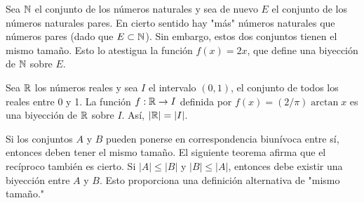 \documentclass[12pt,a4paper]{book}
\newcommand{\comillas}[1]{"#1"}
\begin{document}
    \begin{ejemplo}
        Sea $\mathbb{N}$ el conjunto de los números naturales y sea de nuevo $E$ el conjunto de los números naturales pares. En
        cierto sentido hay \comillas{más} números naturales que números pares (dado que $E\subset\mathbb{N}$). Sin embargo, estos
        dos conjuntos tienen el mismo tamaño. Esto lo atestigua la función $f(x)=2x$, que define una biyección de $\mathbb{N}$
        sobre $E$.
    \end{ejemplo}

    \begin{ejemplo}\label{ej:R-I-mismo-tamano}
        Sea $\mathbb{R}$ los números reales y sea $I$ el intervalo $(0,1)$, el conjunto de todos los reales entre 0 y 1. La función
        $f:\mathbb{R}\rightarrow I$ definida por $f(x)=(2/\pi)\arctan x$ es una biyección de $\mathbb{R}$ sobre $I$. Así, $|\mathbb{R}|=|I|$.
    \end{ejemplo}

    Si los conjuntos $A$ y $B$ pueden ponerse en correspondencia biunívoca entre sí, entonces deben tener el mismo tamaño.
    El siguiente teorema afirma que el recíproco también es cierto. Si $|A|\leq|B|$ y $|B|\leq|A|$, entonces debe existir
    una biyección entre $A$ y $B$. Esto proporciona una definición alternativa de \comillas{mismo tamaño.}
\end{document}
